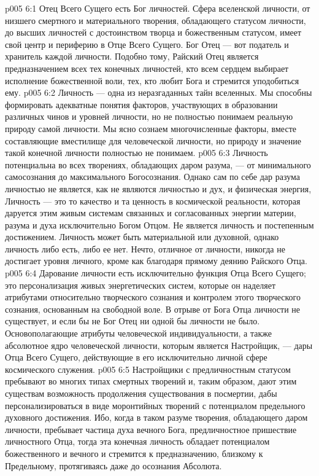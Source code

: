 \vs p005 6:1 Отец Всего Сущего есть Бог личностей. Сфера вселенской личности, от низшего смертного и материального творения, обладающего статусом личности, до высших личностей с достоинством творца и божественным статусом, имеет свой центр и периферию в Отце Всего Сущего. Бог Отец --- вот податель и хранитель каждой личности. Подобно тому, Райский Отец является предназначением всех тех конечных личностей, кто всем сердцем выбирает исполнение божественной воли, тех, кто любит Бога и стремится уподобиться ему.
\vs p005 6:2 \pc Личность --- одна из неразгаданных тайн вселенных. Мы способны формировать адекватные понятия факторов, участвующих в образовании различных чинов и уровней личности, но не полностью понимаем реальную природу самой личности. Мы ясно сознаем многочисленные факторы, вместе составляющие вместилище для человеческой личности, но природу и значение такой конечной личности полностью не понимаем.
\vs p005 6:3 Личность потенциальна во всех творениях, обладающих даром разума, --- от минимального самосознания до максимального Богосознания. Однако сам по себе дар разума личностью не является, как не являются личностью и дух, и физическая энергия, Личность --- это то качество и та ценность в космической реальности, которая даруется этим живым системам связанных и согласованных энергии материи, разума и духа исключительно Богом Отцом. Не является личность и постепенным достижением. Личность может быть материальной или духовной, однако личность либо есть, либо ее нет. Нечто, отличное от личности, никогда не достигает уровня личного, кроме как благодаря прямому деянию Райского Отца.
\vs p005 6:4 Дарование личности есть исключительно функция Отца Всего Сущего; это персонализация живых энергетических систем, которые он наделяет атрибутами относительно творческого сознания и контролем этого творческого сознания, основанным на свободной воле. В отрыве от Бога Отца личности не существует, и если бы не Бог Отец ни одной бы личности не было. Основополагающие атрибуты человеческой индивидуальности, а также абсолютное ядро человеческой личности, которым является Настройщик, --- дары Отца Всего Сущего, действующие в его исключительно личной сфере космического служения.
\vs p005 6:5 \pc Настройщики с предличностным статусом пребывают во многих типах смертных творений и, таким образом, дают этим существам возможность продолжения существования в посмертии, дабы персонализироваться в виде моронтийных творений с потенциалом предельного духовного достижения. Ибо, когда в таком разуме творения, обладающего даром личности, пребывает частица духа вечного Бога, предличностное пришествие личностного Отца, тогда эта конечная личность обладает потенциалом божественного и вечного и стремится к предназначению, близкому к Предельному, протягиваясь даже до осознания Абсолюта.
